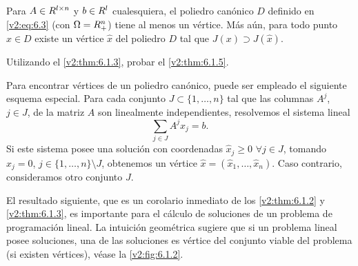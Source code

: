 \begin{theorem}\label{v2:thm:6.1.5}
    Para $A \in R^{l \times n}$ y $b \in R^l$ cualesquiera, el poliedro canónico $D$ definido en \eqref{v2:eq:6.3} (con $\Omega = R^n_+$) tiene al menos un vértice. Más aún, para todo punto $x \in D$ existe un vértice $\hat{x}$ del poliedro $D$ tal que $J(x) \supset J(\hat{x})$.
\end{theorem}

\begin{exercise}\label{v2:ejer:6.1.3}
    Utilizando el \cref{v2:thm:6.1.3}, probar el \cref{v2:thm:6.1.5}.
\end{exercise}

Para encontrar vértices de un poliedro canónico, puede ser empleado el siguiente esquema especial. Para cada conjunto $J \subset \{1, \dots, n\}$ tal que las columnas $A^j$, $j \in J$, de la matriz $A$ son linealmente independientes, resolvemos el sistema lineal
\[
    \sum_{j \in J} A^j x_j = b.
\]
Si este sistema posee una solución con coordenadas $\hat{x}_j \ge 0$ $\forall j \in J$, tomando $\hat{x}_j = 0$, $j \in \{1, \dots, n\} \setminus J$, obtenemos un vértice $\hat{x} = (\hat{x}_1, \dots, \hat{x}_n)$. Caso contrario, consideramos otro conjunto $J$.

El resultado siguiente, que es un corolario inmediato de los \cref{v2:thm:6.1.2} y \cref{v2:thm:6.1.3}, es importante para el cálculo de soluciones de un problema de programación lineal. La intuición geométrica sugiere que si un problema lineal posee soluciones, una de las soluciones es vértice del conjunto viable del problema (si existen vértices), véase la \cref{v2:fig:6.1.2}.

